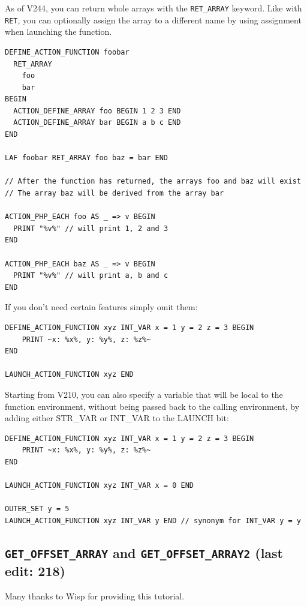 \documentclass{article}
\def\t#1{{\tt #1}}
\begin{document}
As of V244, you can return whole arrays with the \verb+RET_ARRAY+
keyword. Like with \verb+RET+, you can optionally assign the array to
a different name by using assignment when launching the function.

\begin{verbatim}
DEFINE_ACTION_FUNCTION foobar
  RET_ARRAY
    foo
    bar
BEGIN
  ACTION_DEFINE_ARRAY foo BEGIN 1 2 3 END
  ACTION_DEFINE_ARRAY bar BEGIN a b c END
END

LAF foobar RET_ARRAY foo baz = bar END

// After the function has returned, the arrays foo and baz will exist
// The array baz will be derived from the array bar

ACTION_PHP_EACH foo AS _ => v BEGIN
  PRINT "%v%" // will print 1, 2 and 3
END

ACTION_PHP_EACH baz AS _ => v BEGIN
  PRINT "%v%" // will print a, b and c
END

\end{verbatim}

If you don't need certain features simply omit them:
\begin{verbatim}
DEFINE_ACTION_FUNCTION xyz INT_VAR x = 1 y = 2 z = 3 BEGIN
    PRINT ~x: %x%, y: %y%, z: %z%~
END

LAUNCH_ACTION_FUNCTION xyz END
\end{verbatim}

Starting from V210, you can also specify a variable that will be local to the
function environment, without being passed back to the calling environment,
by adding either STR_VAR or INT_VAR to the LAUNCH bit:
\begin{verbatim}
DEFINE_ACTION_FUNCTION xyz INT_VAR x = 1 y = 2 z = 3 BEGIN
    PRINT ~x: %x%, y: %y%, z: %z%~
END

LAUNCH_ACTION_FUNCTION xyz INT_VAR x = 0 END

OUTER_SET y = 5
LAUNCH_ACTION_FUNCTION xyz INT_VAR y END // synonym for INT_VAR y = y
\end{verbatim}

\label{sec-get-offset-array12}\subsection{\t{GET_OFFSET_ARRAY} and \t{GET_OFFSET_ARRAY2} (last edit: 218)}

Many thanks to Wisp for providing this tutorial.
\end{document}

